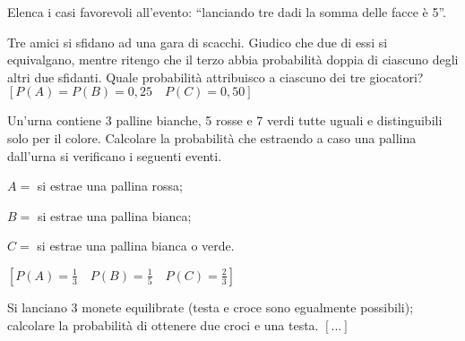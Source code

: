 \begin{esercizio}
 \label{ese:9.7}
Elenca i casi favorevoli all'evento: 
``lanciando tre dadi la somma delle facce è 5''.
\end{esercizio}
% 
% 

\begin{esercizio}[\Ast]
 \label{ese:9.10}
Tre amici si sfidano ad una gara di scacchi. Giudico che due di essi si 
equivalgano, mentre ritengo che il terzo abbia probabilità doppia di ciascuno 
degli altri due sfidanti. Quale probabilità attribuisco a ciascuno dei tre 
giocatori?
\hfill $\left[P(A)=P(B)=0,25 \quad P(C)=0,50\right]$
\end{esercizio}

\begin{esercizio}[\Ast]
 \label{ese:9.11}
Un'urna contiene 3 palline bianche, 5 rosse e 7 verdi tutte uguali e 
distinguibili solo per il colore. Calcolare la probabilità che estraendo a caso 
una pallina dall'urna si verificano i seguenti eventi.
\begin{itemize*}
\item $ A= $ si estrae una pallina rossa;
\item $ B= $ si estrae una pallina bianca;
\item $ C= $ si estrae una pallina bianca o verde.
\end{itemize*}
\hfill $\left[P(A)=\frac{1}{3}\quad P(B)=\frac{1}{5} \quad 
        P(C)=\frac{2}{3}\right]$
\end{esercizio}

\begin{esercizio}
 \label{ese:9.12}
Si lanciano 3 monete equilibrate (testa e croce sono egualmente possibili); 
calcolare la probabilità di ottenere due croci e una testa.
\hfill $\left[...\right]$
\end{esercizio}

